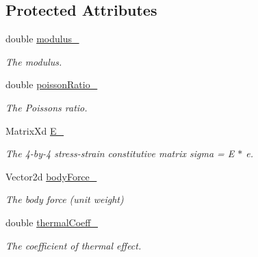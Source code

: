 \subsection*{Protected Attributes}
\begin{DoxyCompactItemize}
\item 
\mbox{\label{class_material_a505d8c136dd80cdfb78e2b9f6468be46}} 
double \mbox{\hyperlink{class_material_a505d8c136dd80cdfb78e2b9f6468be46}{modulus\+\_\+}}
\begin{DoxyCompactList}\small\item\em The modulus. \end{DoxyCompactList}\item 
\mbox{\label{class_material_ac49581c3474d4106011a211f063c5b1d}} 
double \mbox{\hyperlink{class_material_ac49581c3474d4106011a211f063c5b1d}{poisson\+Ratio\+\_\+}}
\begin{DoxyCompactList}\small\item\em The Poisson\textquotesingle{}s ratio. \end{DoxyCompactList}\item 
\mbox{\label{class_material_ad8eb23b2b0c134635888be8e3b6a824c}} 
Matrix\+Xd \mbox{\hyperlink{class_material_ad8eb23b2b0c134635888be8e3b6a824c}{E\+\_\+}}
\begin{DoxyCompactList}\small\item\em The 4-\/by-\/4 stress-\/strain constitutive matrix sigma = E $\ast$ e. \end{DoxyCompactList}\item 
\mbox{\label{class_material_af29cbdb8e4fa9fbc0e04cf89b72a2c18}} 
Vector2d \mbox{\hyperlink{class_material_af29cbdb8e4fa9fbc0e04cf89b72a2c18}{body\+Force\+\_\+}}
\begin{DoxyCompactList}\small\item\em The body force (unit weight) \end{DoxyCompactList}\item 
\mbox{\label{class_material_a51b256107e8ddc53c6b12b90b481034d}} 
double \mbox{\hyperlink{class_material_a51b256107e8ddc53c6b12b90b481034d}{thermal\+Coeff\+\_\+}}
\begin{DoxyCompactList}\small\item\em The coefficient of thermal effect. \end{DoxyCompactList}\item 

\end{DoxyCompactItemize}
